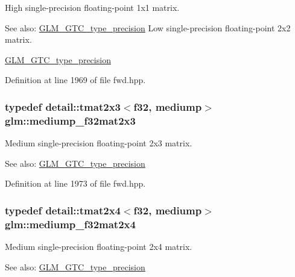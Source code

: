 High single-precision floating-point 1x1 matrix. \begin{Desc}
\item[See also:]\hyperlink{group__gtc__type__precision}{GLM\_\-GTC\_\-type\_\-precision} Low single-precision floating-point 2x2 matrix. 

\hyperlink{group__gtc__type__precision}{GLM\_\-GTC\_\-type\_\-precision} \end{Desc}


Definition at line 1969 of file fwd.hpp.\hypertarget{group__gtc__type__precision_g42497d19668931d225bccf1b9c614c19}{
\subsubsection[mediump\_\-f32mat2x3]{\setlength{\rightskip}{0pt plus 5cm}typedef detail::tmat2x3$<$f32, mediump$>$ {\bf glm::mediump\_\-f32mat2x3}}}
\label{group__gtc__type__precision_g42497d19668931d225bccf1b9c614c19}


Medium single-precision floating-point 2x3 matrix. \begin{Desc}
\item[See also:]\hyperlink{group__gtc__type__precision}{GLM\_\-GTC\_\-type\_\-precision} \end{Desc}


Definition at line 1973 of file fwd.hpp.\hypertarget{group__gtc__type__precision_g20c5b3b715b70f1c09f7f95bfaa7aa84}{
\subsubsection[mediump\_\-f32mat2x4]{\setlength{\rightskip}{0pt plus 5cm}typedef detail::tmat2x4$<$f32, mediump$>$ {\bf glm::mediump\_\-f32mat2x4}}}
\label{group__gtc__type__precision_g20c5b3b715b70f1c09f7f95bfaa7aa84}


Medium single-precision floating-point 2x4 matrix. \begin{Desc}
\item[See also:]\hyperlink{group__gtc__type__precision}{GLM\_\-GTC\_\-type\_\-precision} \end{Desc}


